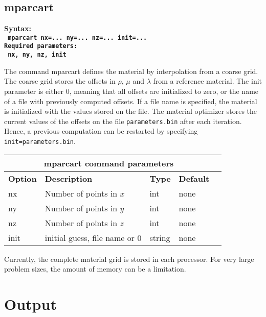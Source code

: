 \documentclass[12pt]{report}
\begin{document}
\subsection{mparcart}\label{sec:mparcart}
\begin{flushleft}\bf
Syntax:\\
\tt
mparcart nx=... ny=... nz=... init=...
\\
\bf Required parameters:\\
\tt
nx, ny, nz, init
\end{flushleft}
%
The command mparcart defines the material by interpolation from a coarse grid.
The coarse grid stores the offsets in $\rho$, $\mu$ and $\lambda$ from a reference material.
The init parameter is either 0, meaning that all offsets are initialized to zero, or the
name of a file with previously computed offsets. If a file name is specified, the material is
initialized with the values stored on the file. The material optimizer stores the current values
of the offsets on the file {\tt parameters.bin} after each iteration. Hence, a previous
computation can be restarted by specifying \verb+init=parameters.bin+.
\begin{center}
\begin{tabular}{|l|p{8cm}|l|l|l|} \hline
\multicolumn{4}{|c|}{\bf mparcart command parameters}\\ \hline
{\bf Option} & {\bf Description}          & {\bf Type} & {\bf Default} \\ \hline 
\hline
nx          & Number of points in $x$   & int    & none \\ \hline
ny          & Number of points in $y$   & int    & none \\ \hline
nz          & Number of points in $z$   & int    & none \\ \hline
init        & initial guess, file name or 0 & string & none \\ \hline
\end{tabular}
\end{center}

Currently, the complete material grid is stored in each processor. For very large problem sizes, the amount 
of memory can be a limitation. 

\section{Output}
\end{document}
